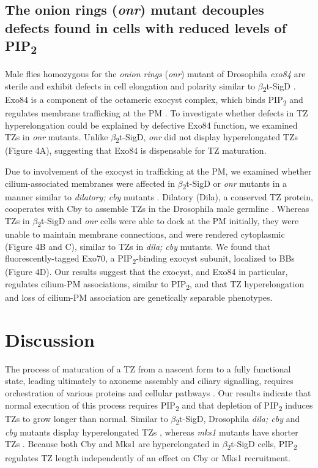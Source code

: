 \documentclass[12pt, twoside, letterpaper]{article}
\newcommand{\PIP}{PIP\textsubscript{2}}
\newcommand{\sigd}{$\beta$\textsubscript{2}t-SigD}
\begin{document}
\begin{doublespacing}
\begin{linenumbers}
    \subsection*{The onion rings (\textit{onr}) mutant decouples defects found in cells with reduced levels of \PIP{}}
    Male flies homozygous for the \textit{onion rings}
    (\textit{onr}) mutant of Drosophila \textit{exo84} are sterile and exhibit defects
    in cell elongation and polarity
    similar to \sigd{} \citep{wei2008depletion}.
    Exo84 is a component of the octameric exocyst complex, which binds
    \PIP{} and regulates membrane trafficking at the PM 
    \citep{he2007exo70}.
    To investigate whether defects in TZ hyperelongation could be explained by
    defective Exo84 function, we examined TZs in \textit{onr} mutants.
    Unlike \sigd{}, \textit{onr} did not display hyperelongated TZs (Figure 4A),
    suggesting that Exo84 is dispensable for TZ maturation.

    Due to involvement of the exocyst in trafficking at the PM,
    we examined whether cilium-associated membranes were affected in \sigd{}
    or \textit{onr} mutants in a manner similar to \textit{dilatory; cby} mutants
    \citep{vieillard2016transition}. 
    Dilatory (Dila), a conserved TZ protein, cooperates with Cby to assemble TZs in
    the Drosophila male germline \citep{vieillard2016transition}.
    Whereas TZs in \sigd{} and \textit{onr} cells were able to dock
    at the PM initially, they were unable to maintain
    membrane connections, and were rendered cytoplasmic (Figure 4B and C), similar to TZs in
    \textit{dila; cby} mutants.
    We found that fluorescently-tagged Exo70, a \PIP{}-binding exocyst subunit,
    localized to BBs (Figure 4D).
    Our results suggest that the exocyst, and Exo84 in particular, regulates
    cilium-PM associations, similar to \PIP{}, and that TZ hyperelongation and loss of
    cilium-PM association are genetically separable phenotypes.

    \section*{Discussion}
    The process of maturation of a TZ from a nascent form to a fully functional state,
    leading ultimately to axoneme assembly and ciliary signalling,
    requires orchestration of various proteins and cellular pathways
    \citep{reiter2012base, gonccalves2017ciliary}.
    Our results indicate that normal execution of this process
    requires \PIP{} and that depletion of \PIP{} induces TZs to
    grow longer than normal.
    Similar to \sigd{}, Drosophila \textit{dila; cby} and \textit{cby}
    mutants display hyperelongated TZs
    \citep{enjolras2012drosophila,vieillard2016transition},
    whereas \textit{mks1} mutants have shorter TZs \citep{pratt2016drosophila}.
    Because both Cby and Mks1 are hyperelongated in \sigd{} cells,
    \PIP{} regulates TZ length independently of an effect on Cby or Mks1 recruitment.


\end{linenumbers}
\end{doublespacing}
\end{document}
